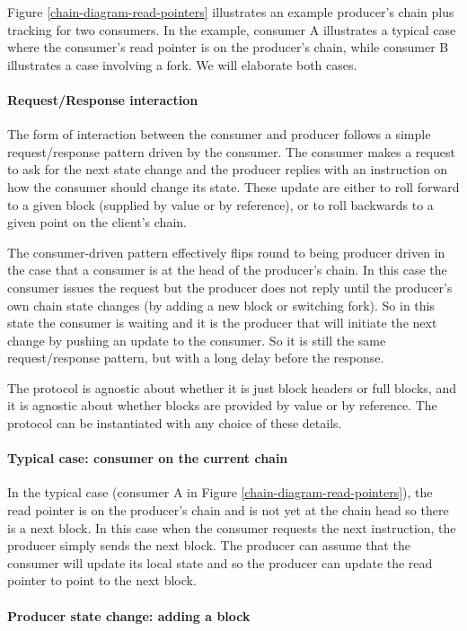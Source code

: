 \documentclass{article}
\theoremstyle{definition}{
  \newtheorem{lemma}{Lemma}[section] %
  \newtheorem{definition}[lemma]{Definition}
}
\theoremstyle{theorem}{
  \newtheorem{invariant}[lemma]{Invariant}
  \newtheorem{proofobligation}[lemma]{Proof Obligation}
}
\numberwithin{equation}{lemma}
\begin{document}
Figure \ref{chain-diagram-read-pointers} illustrates an example producer's
chain plus tracking for two consumers. In the example, consumer A illustrates a
typical case where the consumer's read pointer is on the producer's chain,
while consumer B illustrates a case involving a fork. We will elaborate both
cases.

\paragraph{Request/Response interaction}
The form of interaction between the consumer and producer follows a simple
request/response pattern driven by the consumer. The consumer makes a request
to ask for the next state change and the producer replies with an instruction
on how the consumer should change its state. These update are either to roll
forward to a given block (supplied by value or by reference), or to roll
backwards to a given point on the client's chain.

The consumer-driven pattern effectively flips round to being producer driven in
the case that a consumer is at the head of the producer's chain. In this case
the consumer issues the request but the producer does not reply until the
producer's own chain state changes (by adding a new block or switching fork).
So in this state the consumer is waiting and it is the producer that will
initiate the next change by pushing an update to the consumer. So it is
still the same request/response pattern, but with a long delay before the
response.

The protocol is agnostic about whether it is just block headers or full blocks,
and it is agnostic about whether blocks are provided by value or by reference.
The protocol can be instantiated with any choice of these details.

\paragraph{Typical case: consumer on the current chain}
In the typical case (consumer A in Figure \ref{chain-diagram-read-pointers}),
the read pointer is on the producer's chain and is not yet at the chain head
so there is a next block. In this case when the consumer requests the next
instruction, the producer simply sends the next block. The producer can assume
that the consumer will update its local state and so the producer can update
the read pointer to point to the next block.

\paragraph{Producer state change: adding a block}
\end{document}
